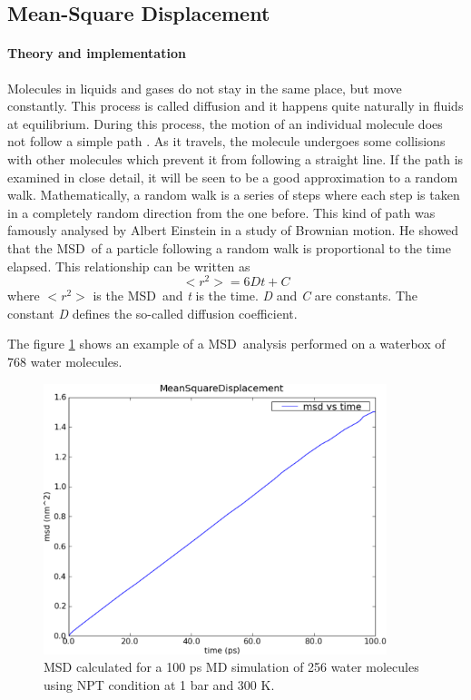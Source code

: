 \documentclass[a4paper,11pt]{article}
\begin{document}
\subsection{Mean-Square Displacement}
\label{msd}
\paragraph{Theory and implementation\\}
\label{msd_theory}
Molecules in liquids and gases do not stay in the same place, but move constantly. 
This process is called diffusion and it happens quite naturally in fluids at equilibrium. 
During this process, the motion of an individual molecule does not follow a simple path \cite{Democritus}. 
As it travels, the molecule undergoes some collisions with other molecules which prevent 
it from following a straight line. If the path is examined in close detail, it will be seen 
to be a good approximation to a random walk. Mathematically, a random walk is a series of steps 
where each step is taken in a completely random direction from the one before. 
This kind of path was famously analysed by Albert Einstein in a study of Brownian motion. He showed 
that the \gls{MSD}\ of a particle following a random walk is 
proportional to the time elapsed. This relationship can be written as
\begin{equation}
<r^2> = 6Dt + C
\end{equation}
where $<r^2>$ is the \gls{MSD}\ and \textit{t} is the time. \textit{D} and \textit{C} are constants. 
The constant \textit{D} defines the so-called diffusion coefficient.

The figure \ref{fig:msd_water} shows an example of a \gls{MSD}\ analysis performed on a waterbox of 768 water molecules.
\begin{figure}[h!]
\begin{center}
\includegraphics[width=10cm]{figures/msd_water.eps}
\end{center}
\caption[Examples of calculated \textit{MSD} with \textit{MDANSE}]{\gls{MSD} calculated for a 100 ps MD simulation of 256 water molecules using NPT condition at 1 bar and 300 K.}
\label{fig:msd_water}
\end{figure}
\end{document}

